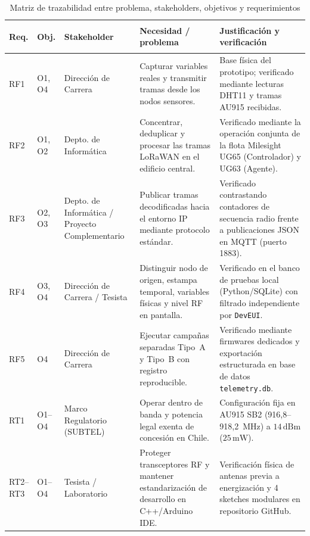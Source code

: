 \documentclass[12pt,oneside,openany,spanish,oldfontcommands]{memoir}
\renewcommand{\arraystretch}{1.15}
\begin{document}
\begin{table}[H]
\centering
\caption{Matriz de trazabilidad entre problema, stakeholders, objetivos y requerimientos}
\label{tab:trazabilidad}
\tiny
\setlength{\tabcolsep}{2.2pt}
\renewcommand{\arraystretch}{0.93}
\begin{tabularx}{\textwidth}{
    >{\bfseries\raggedright\arraybackslash}p{1.3cm}
    >{\centering\arraybackslash}p{1.2cm}
    >{\raggedright\arraybackslash}p{2.0cm}
    >{\raggedright\arraybackslash}X
    >{\raggedright\arraybackslash}X}
\toprule
\textbf{Req.} &
\textbf{Obj.} &
\textbf{Stakeholder} &
\textbf{Necesidad / problema} &
\textbf{Justificación y verificación}\\
\midrule
RF1 & O1, O4 &
Dirección de Carrera
&
Capturar variables reales y transmitir tramas desde los nodos sensores.
&
Base física del prototipo; verificado mediante lecturas DHT11 y tramas AU915 recibidas.
\\
\midrule
RF2 & O1, O2 &
Depto. de Informática
&
Concentrar, deduplicar y procesar las tramas LoRaWAN en el edificio central.
&
Verificado mediante la operación conjunta de la flota Milesight UG65 (Controlador) y UG63 (Agente).
\\
\midrule
RF3 & O2, O3 &
Depto. de Informática / Proyecto Complementario
&
Publicar tramas decodificadas hacia el entorno IP mediante protocolo estándar.
&
Verificado contrastando contadores de secuencia radio frente a publicaciones JSON en MQTT (puerto 1883).
\\
\midrule
RF4 & O3, O4 &
Dirección de Carrera / Tesista
&
Distinguir nodo de origen, estampa temporal, variables físicas y nivel RF en pantalla.
&
Verificado en el banco de pruebas local (Python/SQLite) con filtrado independiente por \texttt{DevEUI}.
\\
\midrule
RF5 & O4 &
Dirección de Carrera
&
Ejecutar campañas separadas Tipo~A y Tipo~B con registro reproducible.
&
Verificado mediante firmwares dedicados y exportación estructurada en base de datos \texttt{telemetry.db}.
\\
\midrule
RT1 & O1--O4 &
Marco Regulatorio (SUBTEL)
&
Operar dentro de banda y potencia legal exenta de concesión en Chile.
&
Configuración fija en AU915 SB2 (916,8--918,2~MHz) a $14\,\text{dBm}$ ($25\,\text{mW}$).
\\
\midrule
\makecell[l]{RT2--\\RT3} & O1--O4 &
Tesista / Laboratorio
&
Proteger transceptores RF y mantener estandarización de desarrollo en C++/Arduino IDE.
&
Verificación física de antenas previa a energización y 4 sketches modulares en repositorio GitHub.

\end{tabularx}
\end{table}
\end{document}
